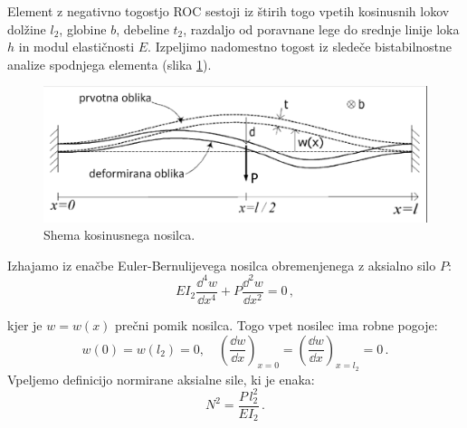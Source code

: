         Element z negativno togostjo ROC sestoji iz štirih togo vpetih kosinusnih lokov dolžine $l_2$, globine $b$, debeline $t_2$, razdaljo od poravnane lege do srednje linije loka $h$ in modul elastičnosti $E$. Izpeljimo nadomestno togost iz sledeče bistabilnostne analize \cite{liu2000microelectromech} spodnjega elementa (slika \ref{fig:kosinusni nosilec}).
        \begin{figure}[!hb]
                \centering
                \includegraphics[trim=0 0 0.1cm 0.1cm, clip, scale=0.4]{Magisterski praktikum/slike/teorija/kosinusni nosilec.png}
                \caption{Shema kosinusnega nosilca.}\label{fig:kosinusni nosilec}
        \end{figure}
        
        \newpage
        Izhajamo iz enačbe Euler-Bernulijevega nosilca obremenjenega z aksialno silo $P$: 
        \begin{equation}
            E I_2 \frac{\dd ^4 w}{\dd x^4}+P \frac{\dd^2 w}{\dd x^2}=0 \, ,
        \end{equation}
        
        kjer je $w=w(x)$ prečni pomik nosilca. Togo vpet nosilec ima robne pogoje:
        \begin{equation}
            w(0)=w(l_2)=0, \quad\left(\frac{\dd w}{\dd x}\right)_{x=0}=\left(\frac{\dd w}{\dd x}\right)_{x=l_2}=0 \, .
        \end{equation}
        Vpeljemo definicijo normirane aksialne sile, ki je enaka:
        \begin{equation}
            N^2=\frac{P \, l_2^2}{E I_2} \, .
        \end{equation}
        

